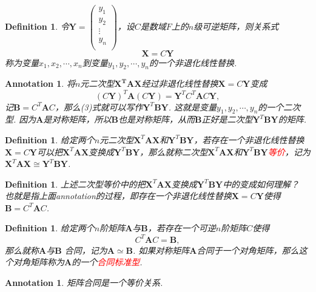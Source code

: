 \documentclass{article}
\newtheorem{definition}[theorem]{Definition}
\newtheorem{annotation}[theorem]{Annotation}
\newcommand{\mbf}[1]{\bm{#1}}
\newcommand{\redt}[1]{\textcolor{red}{#1}}
\begin{document}
\begin{definition}
\rm 令$\mbf{Y}=\begin{pmatrix}
y_1 \\
y_2 \\
\vdots \\
y_n \\
\end{pmatrix}$，设$C$是数域$F$上的$n$级可逆矩阵，则关系式
$$
\mbf{X} = C\mbf{Y}
$$
称为变量$x_1,x_2,\cdots,x_n$到变量$y_1,y_2,\cdots,y_n$的一个{\color{red}非退化线性替换}. 
\end{definition}

\begin{annotation}
\rm 将$n$元二次型$\mbf{X^T}\mbf{A}\mbf{X}$经过非退化线性替换$\mbf{X} = C\mbf{Y}$变成
\begin{equation}
(C\mbf{Y})^T\mbf{A}(C\mbf{Y}) = \mbf{Y}^TC^T\mbf{A}C\mbf{Y},
\end{equation}
记$\mbf{B}=C^T\mbf{A}C$，那么(3)式就可以写作$\mbf{Y}^T\mbf{B}\mbf{Y}$. 这就是变量$y_1,y_2,\cdots,y_n$的一个二次型. 因为$\mbf{A}$是对称矩阵，所以$\mbf{B}$也是对称矩阵，从而$\mbf{B}$正好是二次型$\mbf{Y}^T\mbf{B}\mbf{Y}$的矩阵.
\end{annotation}

\begin{definition}
\rm 给定两个$n$元二次型$\mbf{X}^T\mbf{A}\mbf{X}$和$\mbf{Y}^T\mbf{B}\mbf{Y}$，若存在一个非退化线性替换$\mbf{X} = C\mbf{Y}$可以把$\mbf{X}^T\mbf{A}\mbf{X}$变换成$\mbf{Y}^T\mbf{B}\mbf{Y}$，那么就称二次型$\mbf{X}^T\mbf{A}\mbf{X}$和$\mbf{Y}^T\mbf{B}\mbf{Y}$\redt{等价}，记为$\mbf{X}^T\mbf{A}\mbf{X} \cong \mbf{Y}^T\mbf{B}\mbf{Y}$. 
\end{definition}

\begin{definition}
\rm 上述二次型等价中的把$\mbf{X}^T\mbf{A}\mbf{X}$变换成$\mbf{Y}^T\mbf{B}\mbf{Y}$中的变成如何理解？ 也就是指上面annotation的过程，即存在一个非退化线性替换$\mbf{X} = C\mbf{Y}$使得$\mbf{B} = C^T\mbf{A}C$.
\end{definition}

\begin{definition}
\rm 给定两个$n$阶矩阵$\mbf{A}$与$\mbf{B}$，若存在一个可逆$n$阶矩阵$C$使得
$$
C^T\mbf{A}C = \mbf{B},
$$
那么就称$\mbf{A}$与$\mbf{B}$ {\color{red}合同}，记为$\mbf{A} \simeq \mbf{B}$. 如果对称矩阵$\mbf{A}$合同于一个对角矩阵，那么这个对角矩阵称为$\mbf{A}$的一个\redt{合同标准型}. 
\end{definition}

\begin{annotation}
\rm 矩阵合同是一个等价关系. 
\end{annotation}
\end{document}
